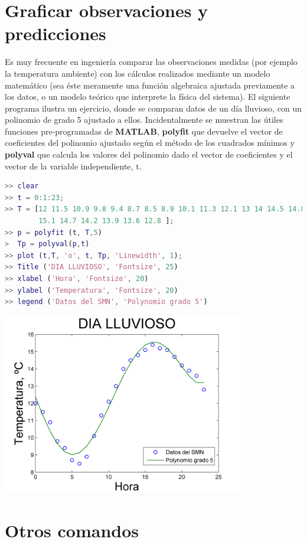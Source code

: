 \section{Graficar observaciones y predicciones}

Es muy frecuente en ingeniería comparar las observaciones medidas (por ejemplo la temperatura 
ambiente) con los cálculos realizados mediante un modelo matemático (sea éste meramente una 
función algebraica ajustada previamente a los datos, o un modelo teórico que interprete la física del sistema). El siguiente programa ilustra un ejercicio, donde se comparan datos de un día lluvioso, con un polinomio de grado 5 ajustado a ellos. Incidentalmente se muestran las útiles funciones pre-programadas de \textbf{MATLAB}, \textbf{polyfit} que devuelve el vector de coeficientes del polinomio ajustado según el método de los cuadrados mínimos y \textbf{polyval} que calcula los valores del polinomio dado el vector de coeficientes y el vector de la variable 
independiente, t.

\begin{lstlisting}[language=Matlab]
>> clear 
>> t = 0:1:23; 
>> T = [12 11.5 10.9 9.8 9.4 8.7 8.5 8.9 10.1 11.3 12.1 13 14 14.5 14.8 15.1 15.4 15.2... 
        15.1 14.7 14.2 13.9 13.6 12.8 ]; 
>> p = polyfit (t, T,5) 
>  Tp = polyval(p,t) 
>> plot (t,T, 'o', t, Tp, 'Linewidth', 1); 
>> Title ('DIA LLUVIOSO', 'Fontsize', 25) 
>> xlabel ('Hora', 'Fontsize', 20) 
>> ylabel ('Temperatura', 'Fontsize', 20) 
>> legend ('Datos del SMN', 'Polynomio grado 5') 
\end{lstlisting}
\begin{center}
\includegraphics[width=300pt]{./Imagenes/polyfit.png}
\end{center}

\section{Otros comandos}

